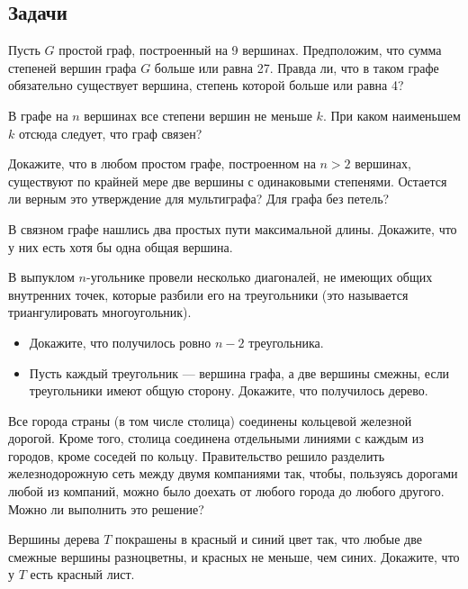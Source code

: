 \documentclass[a4paper,12pt,twoside]{article}
\begin{document}
\subsection*{Задачи}
\begin{?}
    Пусть $G$ простой граф, построенный на 9 вершинах. Предположим, что сумма степеней вершин графа $G$ больше или равна 27. Правда ли, что в таком графе обязательно существует вершина, степень которой больше или равна 4?
\end{?}
\begin{?}
    В графе на $n$ вершинах все степени вершин не меньше $k$. При каком наименьшем $k$ отсюда следует, что граф связен?
\end{?}
\begin{?}    
    Докажите, что в любом простом графе, построенном на $n > 2$ вершинах, существуют по крайней мере две вершины с одинаковыми степенями. Остается ли верным это утверждение для мультиграфа? Для графа без петель?
\end{?}
\begin{?}
    В связном графе нашлись два простых пути максимальной длины. Докажите, что у них есть хотя бы одна общая вершина.
\end{?}
\begin{?}
    В выпуклом $n$-угольнике провели несколько диагоналей, не имеющих общих внутренних точек, которые
    разбили его на треугольники (это называется триангулировать многоугольник).
    \begin{itemize}[noitemsep, parsep=0pt,topsep=0pt]
        \item Докажите, что получилось ровно $n-2$ треугольника.
        \item Пусть каждый треугольник --- вершина графа, а две вершины смежны, если треугольники имеют общую
        сторону. Докажите, что получилось дерево.
    \end{itemize}
\end{?}
\begin{?}
    Все города страны (в том числе столица) соединены кольцевой железной дорогой. Кроме того, столица соединена отдельными линиями с каждым из городов, кроме соседей по кольцу. Правительство решило разделить железнодорожную сеть между двумя компаниями так, чтобы, пользуясь дорогами любой из компаний, можно было доехать от любого города до любого другого. Можно ли выполнить это решение?
\end{?}
\begin{?}
    Вершины дерева $T$ покрашены в красный и синий цвет так, что любые две смежные вершины разноцветны, и красных не меньше, чем синих. Докажите, что у $T$ есть красный лист.
\end{?}
\end{document}
